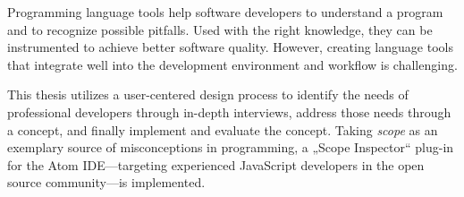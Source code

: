 Programming language tools help software developers to understand a
program and to recognize possible pitfalls. Used with the right
knowledge, they can be instrumented to achieve better software quality.
However, creating language tools that integrate well into the
development environment and workflow is challenging.

This thesis utilizes a user-centered design process to identify the
needs of professional developers through in-depth interviews, address
those needs through a concept, and finally implement and evaluate the
concept. Taking \emph{scope} as an exemplary source of misconceptions in
programming, a „Scope Inspector“ plug-in for the Atom IDE—targeting
experienced JavaScript developers in the open source community—is
implemented.
